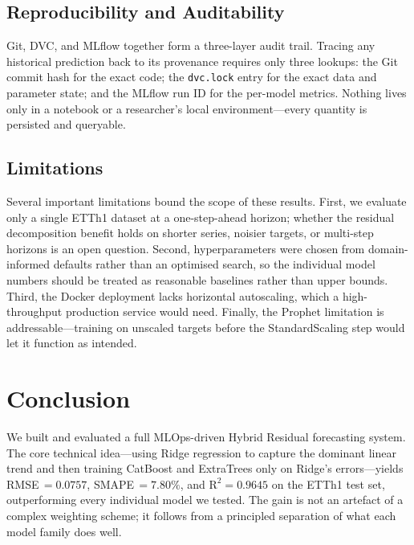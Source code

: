 \documentclass[conference]{IEEEtran}
\begin{document}
  \subsection{Reproducibility and Auditability}

  Git, DVC, and MLflow together form a three-layer audit trail. Tracing any historical
  prediction back to its provenance requires only three lookups: the Git commit hash
  for the exact code; the \texttt{dvc.lock} entry for the exact data and parameter
  state; and the MLflow run ID for the per-model metrics. Nothing lives only in a
  notebook or a researcher's local environment---every quantity is persisted and
  queryable.

  \subsection{Limitations}

  Several important limitations bound the scope of these results. First, we evaluate
  only a single ETTh1 dataset at a one-step-ahead horizon; whether the residual
  decomposition benefit holds on shorter series, noisier targets, or multi-step
  horizons is an open question. Second, hyperparameters were chosen from
  domain-informed defaults rather than an optimised search, so the individual model
  numbers should be treated as reasonable baselines rather than upper bounds. Third,
  the Docker deployment lacks horizontal autoscaling, which a high-throughput production
  service would need. Finally, the Prophet limitation is addressable---training on
  unscaled targets before the StandardScaling step would let it function as intended.

  \section{Conclusion}

  We built and evaluated a full MLOps-driven Hybrid Residual forecasting system. The
  core technical idea---using Ridge regression to capture the dominant linear trend and
  then training CatBoost and ExtraTrees only on Ridge's errors---yields
  RMSE\,$=0.0757$, SMAPE\,$=7.80\%$, and $\text{R}^{2}=0.9645$ on the ETTh1 test
  set, outperforming every individual model we tested. The gain is not an artefact of
  a complex weighting scheme; it follows from a principled separation of what each
  model family does well.
\end{document}
